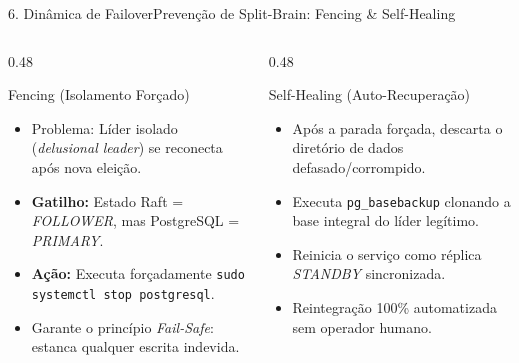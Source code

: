 \documentclass[aspectratio=169,10pt]{beamer}
\begin{document}
\begin{frame}{6. Dinâmica de Failover}{Prevenção de Split-Brain: Fencing \& Self-Healing}
  \begin{columns}[t]
    \begin{column}{0.48\textwidth}
      \begin{alertblock}{Fencing (Isolamento Forçado)}
        \begin{itemize}
          \item Problema: Líder isolado (\textit{delusional leader}) se reconecta após nova eleição.
          \item \textbf{Gatilho:} Estado Raft = \textit{FOLLOWER}, mas PostgreSQL = \textit{PRIMARY}.
          \item \textbf{Ação:} Executa forçadamente \texttt{sudo systemctl stop postgresql}.
          \item Garante o princípio \textit{Fail-Safe}: estanca qualquer escrita indevida.
        \end{itemize}
      \end{alertblock}
    \end{column}
    \begin{column}{0.48\textwidth}
      \begin{exampleblock}{Self-Healing (Auto-Recuperação)}
        \begin{itemize}
          \item Após a parada forçada, descarta o diretório de dados defasado/corrompido.
          \item Executa \texttt{pg\_basebackup} clonando a base integral do líder legítimo.
          \item Reinicia o serviço como réplica \textit{STANDBY} sincronizada.
          \item Reintegração 100\% automatizada sem operador humano.
        \end{itemize}
      \end{exampleblock}
    \end{column}
  \end{columns}
\end{frame}
\end{document}
